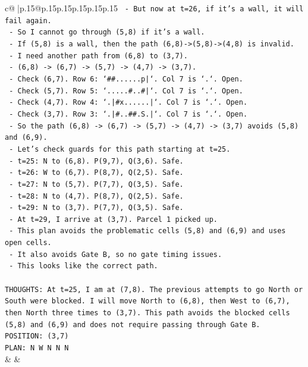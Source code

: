 \documentclass{article}
\begin{document}
{\begin{supertabular}{c@{$\;$}|p{.15\linewidth}@{}p{.15\linewidth}p{.15\linewidth}p{.15\linewidth}p{.15\linewidth}p{.15\linewidth}}
{{{\texttt{  {-} But now at t=26, if it's a wall, it will fail again.} \\
\texttt{  {-} So I cannot go through (5,8) if it's a wall.} \\
\texttt{  {-} If (5,8) is a wall, then the path (6,8){-}>(5,8){-}>(4,8) is invalid.} \\
\texttt{  {-} I need another path from (6,8) to (3,7).} \\
\texttt{  {-} (6,8) {-}> (6,7) {-}> (5,7) {-}> (4,7) {-}> (3,7).} \\
\texttt{  {-} Check (6,7). Row 6: `\#\#......p|`. Col 7 is `.`. Open.} \\
\texttt{  {-} Check (5,7). Row 5: `.....\#..\#|`. Col 7 is `.`. Open.} \\
\texttt{  {-} Check (4,7). Row 4: `.|\#x......|`. Col 7 is `.`. Open.} \\
\texttt{  {-} Check (3,7). Row 3: `.|\#..\#\#.S.|`. Col 7 is `.`. Open.} \\
\texttt{  {-} So the path (6,8) {-}> (6,7) {-}> (5,7) {-}> (4,7) {-}> (3,7) avoids (5,8) and (6,9).} \\
\texttt{  {-} Let's check guards for this path starting at t=25.} \\
\texttt{  {-} t=25: N to (6,8). P(9,7), Q(3,6). Safe.} \\
\texttt{  {-} t=26: W to (6,7). P(8,7), Q(2,5). Safe.} \\
\texttt{  {-} t=27: N to (5,7). P(7,7), Q(3,5). Safe.} \\
\texttt{  {-} t=28: N to (4,7). P(8,7), Q(2,5). Safe.} \\
\texttt{  {-} t=29: N to (3,7). P(7,7), Q(3,5). Safe.} \\
\texttt{  {-} At t=29, I arrive at (3,7). Parcel 1 picked up.} \\
\texttt{  {-} This plan avoids the problematic cells (5,8) and (6,9) and uses open cells.} \\
\texttt{  {-} It also avoids Gate B, so no gate timing issues.} \\
\texttt{  {-} This looks like the correct path.} \\
\\ 
\texttt{THOUGHTS: At t=25, I am at (7,8). The previous attempts to go North or South were blocked. I will move North to (6,8), then West to (6,7), then North three times to (3,7). This path avoids the blocked cells (5,8) and (6,9) and does not require passing through Gate B.} \\
\texttt{POSITION: (3,7)} \\
\texttt{PLAN: N W N N N} \\
            }
        }
    }
    & & \\ \\


\end{supertabular}}
\end{document}
